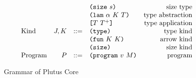 \documentclass[../main.tex]{subfiles}
\begin{document}
\begin{figure*}[t]
\[\begin{array}{lrclr}
                                  &     &     & \texttt{(} \texttt{size} ~ s \texttt{)}                  & \textrm{size type}\\
                                  &     &     & \texttt{(} \texttt{lam} ~ \alpha ~ K ~ T \texttt{)}        & \textrm{type abstraction}\\
                                  &     &     & \texttt{[} T ~ T^+ \texttt{]}              & \textrm{type application}\\
        \textrm{Kind}             & J,K & ::= & \texttt{(} \texttt{type} \texttt{)}{}                   & \textrm{type kind}\\
                                  &     &     & \texttt{(} \texttt{fun} ~ K ~ K \texttt{)}                & \textrm{arrow kind}\\
                                  &     &     & \texttt{(} \texttt{size} \texttt{)}{}                   & \textrm{size kind}\\
        \textrm{Program}          & P   & ::= & \texttt{(} \texttt{program} ~ v ~ M \texttt{)}             & \textrm{program}\\

    \end{array}\]
    \caption{Grammar of Plutus Core}
    \label{fig:Plutus_core_grammar}
\end{figure*}
\end{document}
